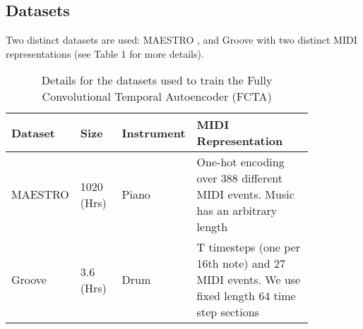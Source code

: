 \documentclass[11pt,a4paper]{article}
\begin{document}
\subsection{Datasets}
\label{ssec:experiments}

Two distinct datasets are used: MAESTRO  \cite{hawthorne2018enabling}, and Groove \cite{groove2019} with two distinct MIDI representations (see Table 1 for more details).

\begin{table*}[ht]
    \centering
    \begin{tabular}{p{0.15\linewidth} | p{0.15\linewidth} | p{0.1\linewidth}  | p{0.45\linewidth} }
      Dataset  & Size  & Instrument &  MIDI Representation\\ \hline
      MAESTRO  & 1020 (Hrs)   & Piano &  One-hot encoding over 388 different MIDI events. Music has an arbitrary length \cite{DBLP:journals/corr/abs-1808-03715} \\
        \hline
        Groove & 3.6 (Hrs)  & Drum &  T timesteps (one per 16th note) and 27 MIDI events. We use fixed length 64 time step sections \cite{groove2019} \\
    \end{tabular}
    \caption{Details for the datasets used to train the Fully Convolutional Temporal Autoencoder (FCTA) }
    \label{tab:my_label}
\end{table*}
\end{document}
